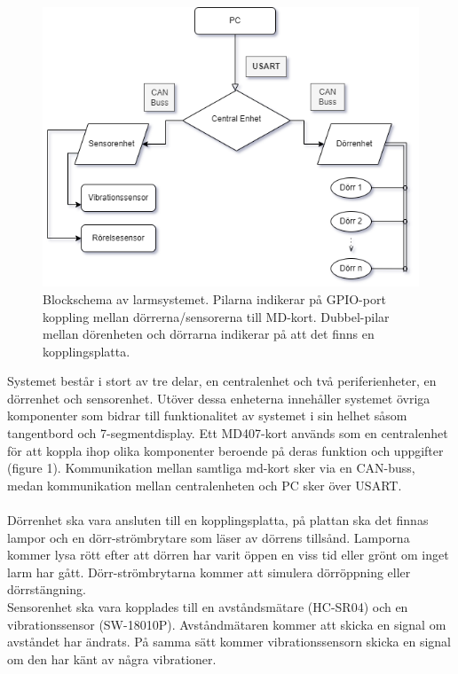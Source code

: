 \documentclass{article}
\begin{document}
\begin{figure}[h]
    \centering
    \includegraphics[scale=0.8]{Projektrapport/diagram.png}
    \caption {Blockschema av larmsystemet. Pilarna indikerar på GPIO-port koppling mellan dörrerna/sensorerna till MD-kort. Dubbel-pilar mellan dörenheten och dörrarna indikerar på att det finns en kopplingsplatta.}
    \label{fig:drawing}
\end{figure}

Systemet består i stort av tre delar, en centralenhet och två periferienheter, en dörrenhet och sensorenhet. 
Utöver dessa enheterna innehåller systemet övriga komponenter som bidrar till funktionalitet av systemet i sin helhet såsom tangentbord och 7-segmentdisplay. Ett MD407-kort används som en centralenhet för att koppla ihop olika komponenter beroende på deras funktion och uppgifter (figure 1).
Kommunikation mellan samtliga md-kort sker via en CAN-buss, medan kommunikation mellan centralenheten och PC sker över USART. \\
\\

Dörrenhet ska vara ansluten till en kopplingsplatta, på plattan ska det finnas lampor och en dörr-strömbrytare som läser av dörrens tillsånd.
Lamporna kommer lysa rött efter att dörren har varit öppen en viss tid eller grönt om inget larm har gått. 
Dörr-strömbrytarna kommer att simulera dörröppning eller dörrstängning. 
\\
Sensorenhet ska vara kopplades till en avståndsmätare (HC-SR04) och en vibrationssensor (SW-18010P). 
Avståndmätaren kommer att skicka en signal om avståndet har ändrats. 
På samma sätt kommer vibrationssensorn skicka en signal om den har känt av några vibrationer. \\
\end{document}
